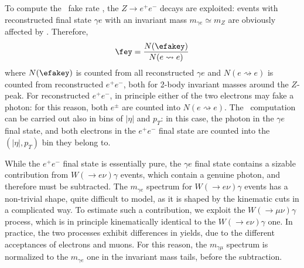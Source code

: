 
To compute the \efakey\ fake rate \fey, the $Z\to e^+e^-$ decays are exploited: events with reconstructed final state $\gamma e$ with an invariant mass $m_{\gamma e}\simeq m_Z$ are obviously affected by \efakey.
Therefore,
$$
\fey=\frac{N(\efakey)}{N(e\rightsquigarrow e)}
$$
where $N(\efakey)$ is counted from all reconstructed $\gamma e$ and $N(e\rightsquigarrow e)$ is counted from reconstructed $e^+e^-$, both for 2-body invariant masses around the $Z$-peak. For reconstructed $e^+e^-$, in principle either of the two electrons may fake a photon: for this reason, both $e^\pm$ are counted into $N(e\rightsquigarrow e)$. The \fey\ computation can be carried out also in bins of $|\eta|$ and $p_T$: in this case, the photon in the $\gamma e$ final state, and both electrons in the $e^+e^-$ final state are counted into the $(|\eta|,p_T)$ bin they belong to.

While the $e^+e^-$ final state is essentially pure, the $\gamma e$ final state contains a sizable contribution from $W(\to e\nu)\gamma$ events, which contain a genuine photon, and therefore must be subtracted. The $m_{\gamma e}$ spectrum for $W(\to e\nu)\gamma$ events has a non-trivial shape, quite difficult to model, as it is shaped by the kinematic cuts in a complicated way. To estimate such a contribution, we exploit the $W(\to\mu\nu)\gamma$ process, which is in principle kinematically identical to the $W(\to e\nu)\gamma$ one. In practice, the two processes exhibit differences in yields, due to the different acceptances of electrons and muons. For this reason, the $m_{\gamma\mu}$ spectrum is normalized to the $m_{\gamma e}$ one in the invariant mass tails, before the subtraction.

